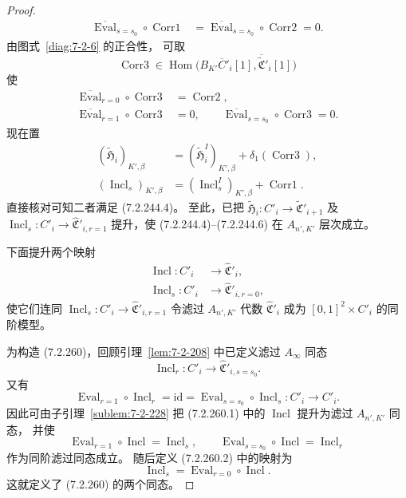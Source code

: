 \begin{proof}
\begin{align}
\overline{\operatorname{Eval}}_{s=s_0}\circ
\operatorname{Corr1}
&=\overline{\operatorname{Eval}}_{s=s_0}\circ
\operatorname{Corr2}=0.
\tag{7.2.259.3}\label{eq:7-2-259-3}
\end{align}
由图式~\ref{diag:7-2-6} 的正合性，
可取
\[
\operatorname{Corr3}\in
\operatorname{Hom}\bigl(
B_{K'}\overline C'_i[1],
\overline{\widetilde{\mathfrak C}}'_i[1]
\bigr)
\]
使
\[
\begin{aligned}
\overline{\operatorname{Eval}}_{r=0}\circ
\operatorname{Corr3}
&=\operatorname{Corr2},\\
\overline{\operatorname{Eval}}_{r=1}\circ
\operatorname{Corr3}
&=0,\qquad
\overline{\operatorname{Eval}}_{s=s_0}\circ
\operatorname{Corr3}=0.
\end{aligned}
\]
现在置
\[
\begin{aligned}
(\widetilde{\mathfrak H}_i)_{K',\beta}
&=(\widetilde{\mathfrak H}_i^I)_{K',\beta}
+\delta_1(\operatorname{Corr3}),\\
(\operatorname{Incl}_s)_{K',\beta}
&=(\operatorname{Incl}_s^I)_{K',\beta}
+\operatorname{Corr1}.
\end{aligned}
\]
直接核对可知二者满足 (7.2.244.4)。
至此，已把
$\widetilde{\mathfrak H}_i\colon
C'_i\to\widetilde{\mathfrak C}'_{i+1}$
及
$\operatorname{Incl}_s\colon C'_i\to
\widehat{\mathfrak C}'_{i,r=1}$
提升，使 (7.2.244.4)--(7.2.244.6)
在 $A_{n',K'}$ 层次成立。

下面提升两个映射
\begin{align}
\operatorname{Incl}\colon
C'_i&\longrightarrow
\widehat{\mathfrak C}'_i,
\tag{7.2.260.1}\label{eq:7-2-260-1}\\
\operatorname{Incl}_s\colon
C'_i&\longrightarrow
\widehat{\mathfrak C}'_{i,r=0},
\tag{7.2.260.2}\label{eq:7-2-260-2}
\end{align}
使它们连同
$\operatorname{Incl}_s\colon C'_i\to
\widehat{\mathfrak C}'_{i,r=1}$
令滤过 $A_{n',K'}$ 代数
$\widehat{\mathfrak C}'_i$
成为 $[0,1]^2\times C'_i$ 的同阶模型。

为构造 (7.2.260)，回顾引理~\ref{lem:7-2-208}
中已定义滤过 $A_\infty$ 同态
\[
\operatorname{Incl}_r\colon C'_i\to
\widehat{\mathfrak C}'_{i,s=s_0}.
\]
又有
\[
\operatorname{Eval}_{r=1}\circ
\operatorname{Incl}_r
=\mathrm{id}
=\operatorname{Eval}_{s=s_0}\circ
\operatorname{Incl}_s
\colon C'_i\to C'_i.
\]
因此可由子引理~\ref{sublem:7-2-228}
把 (7.2.260.1) 中的
$\operatorname{Incl}$
提升为滤过 $A_{n',K'}$ 同态，
并使
\[
\operatorname{Eval}_{r=1}\circ
\operatorname{Incl}
=\operatorname{Incl}_s,
\qquad
\operatorname{Eval}_{s=s_0}\circ
\operatorname{Incl}
=\operatorname{Incl}_r
\]
作为同阶滤过同态成立。
随后定义 (7.2.260.2) 中的映射为
\[
\operatorname{Incl}_s
=\operatorname{Eval}_{r=0}\circ
\operatorname{Incl}.
\]
这就定义了 (7.2.260) 的两个同态。


\end{proof}
